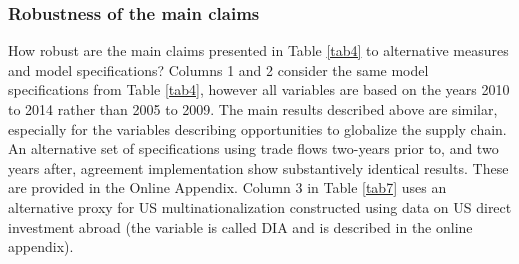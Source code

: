 \documentclass[hidelinks,12pt,letter]{article}
\begin{document}
\subsubsection*{Robustness of the main claims}
How robust are the main claims presented in Table \ref{tab4} to alternative measures and model specifications? %
Columns 1 and 2 consider the same model specifications from Table \ref{tab4}, however all variables are based on the years 2010 to 2014 rather than 2005 to 2009. The main results described above are similar, especially for the variables describing opportunities to globalize the supply chain. %
An alternative set of specifications using trade flows two-years prior to, and two years after, agreement implementation show substantively identical results. These are provided in the Online Appendix. %
Column 3 in Table \ref{tab7} uses an alternative proxy for US multinationalization constructed using data on US direct investment abroad (the variable is called DIA and is described in the online appendix).
\end{document}

